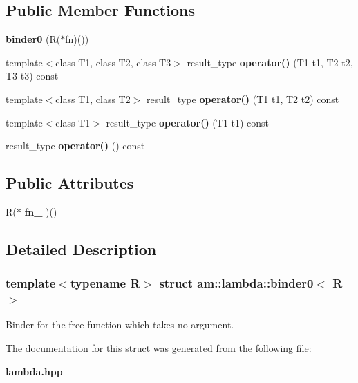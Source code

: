 \subsection*{Public Member Functions}
\begin{CompactItemize}
\item 
\textbf{binder0} (R($\ast$fn)())\label{structam_1_1lambda_1_1binder0_503871dd93616d4b9fef28c3fcb59794}

\item 
template$<$class T1, class T2, class T3$>$ result\_\-type \textbf{operator()} (T1 t1, T2 t2, T3 t3) const \label{structam_1_1lambda_1_1binder0_140466dec5fe7965454887eea6ccc01b}

\item 
template$<$class T1, class T2$>$ result\_\-type \textbf{operator()} (T1 t1, T2 t2) const\label{structam_1_1lambda_1_1binder0_e6af6516938a98c05aa3f74b296c01d9}

\item 
template$<$class T1$>$ result\_\-type \textbf{operator()} (T1 t1) const \label{structam_1_1lambda_1_1binder0_69732777801aca26cb708730366b78bb}

\item 
result\_\-type \textbf{operator()} () const\label{structam_1_1lambda_1_1binder0_bf97e5aae6c88c14a03775ae1458d037}

\end{CompactItemize}
\subsection*{Public Attributes}
\begin{CompactItemize}
\item 
R($\ast$ \textbf{fn\_\-} )()\label{structam_1_1lambda_1_1binder0_1d5bd3720645f4288bfe02e1658cfcd0}

\end{CompactItemize}


\subsection{Detailed Description}
\subsubsection*{template$<$typename R$>$ struct am::lambda::binder0$<$ R $>$}

Binder for the free function which takes no argument. 



The documentation for this struct was generated from the following file:\begin{CompactItemize}
\item 
{\bf lambda.hpp}\end{CompactItemize}
